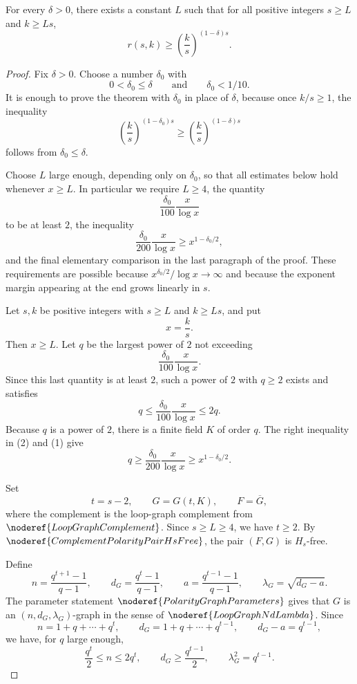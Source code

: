 \begin{theorem}
For every \(\delta>0\), there exists a constant \(L\) such that for all positive integers \(s\ge L\) and \(k\ge Ls\),
\[
  r(s,k)\ge \left(\frac{k}{s}\right)^{(1-\delta)s}.
\]
\end{theorem}
\begin{proof}
Fix \(\delta>0\). Choose a number \(\delta_0\) with
\[
  0<\delta_0\le \delta
  \qquad\text{and}\qquad
  \delta_0<1/10.
\]
It is enough to prove the theorem with \(\delta_0\) in place of \(\delta\), because once \(k/s\ge1\), the inequality
\[
  \left(\frac{k}{s}\right)^{(1-\delta_0)s}
  \ge
  \left(\frac{k}{s}\right)^{(1-\delta)s}
\]
follows from \(\delta_0\le\delta\).

Choose \(L\) large enough, depending only on \(\delta_0\), so that all estimates below hold whenever \(x\ge L\). In particular we require \(L\ge4\), the quantity
\[
  \frac{\delta_0}{100}\frac{x}{\log x}
\]
to be at least \(2\), the inequality
\[
  \frac{\delta_0}{200}\frac{x}{\log x}
  \ge x^{1-\delta_0/2}, \tag{1}
\]
and the final elementary comparison in the last paragraph of the proof. These requirements are possible because \(x^{\delta_0/2}/\log x\to\infty\) and because the exponent margin appearing at the end grows linearly in \(s\).

Let \(s,k\) be positive integers with \(s\ge L\) and \(k\ge Ls\), and put
\[
  x=\frac{k}{s}.
\]
Then \(x\ge L\). Let \(q\) be the largest power of \(2\) not exceeding
\[
  \frac{\delta_0}{100}\frac{x}{\log x}.
\]
Since this last quantity is at least \(2\), such a power of \(2\) with \(q\ge2\) exists and satisfies
\[
  q\le \frac{\delta_0}{100}\frac{x}{\log x}\le 2q. \tag{2}
\]
Because \(q\) is a power of \(2\), there is a finite field \(K\) of order \(q\). The right inequality in (2) and (1) give
\[
  q\ge \frac{\delta_0}{200}\frac{x}{\log x}
  \ge x^{1-\delta_0/2}. \tag{3}
\]

Set
\[
  t=s-2,\qquad G=G(t,K),\qquad F=\overline G,
\]
where the complement is the loop-graph complement from \(\noderef{LoopGraphComplement}\). Since \(s\ge L\ge4\), we have \(t\ge2\). By \(\noderef{ComplementPolarityPairHsFree}\), the pair \((F,G)\) is \(H_s\)-free.

Define
\[
  n=\frac{q^{t+1}-1}{q-1},\qquad
  d_G=\frac{q^t-1}{q-1},\qquad
  a=\frac{q^{t-1}-1}{q-1},\qquad
  \lambda_G=\sqrt{d_G-a}.
\]
The parameter statement \(\noderef{PolarityGraphParameters}\) gives that \(G\) is an \((n,d_G,\lambda_G)\)-graph in the sense of \(\noderef{LoopGraphNdLambda}\). Since
\[
  n=1+q+\cdots+q^t,\qquad
  d_G=1+q+\cdots+q^{t-1},\qquad
  d_G-a=q^{t-1},
\]
we have, for \(q\) large enough,
\[
  \frac{q^t}{2}\le n\le2q^t,\qquad
  d_G\ge \frac{q^{t-1}}{2},\qquad
  \lambda_G^2=q^{t-1}. \tag{4}
\]


\end{proof}
